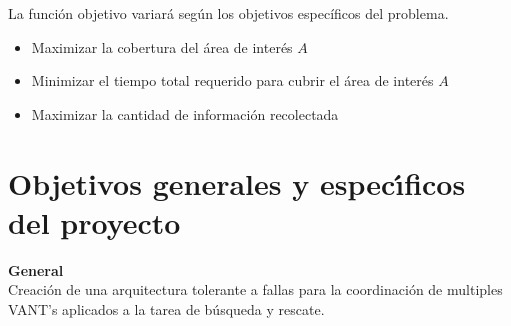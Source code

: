 \documentclass[11pt,epsf,times]{article}
\begin{document}
La función objetivo variará según los objetivos específicos del problema.
\begin{itemize}
\item Maximizar la cobertura del área de interés $A$
\item Minimizar el tiempo total requerido para cubrir el área de interés $A$
\item Maximizar la cantidad de información recolectada
\end{itemize}

\newpage
\section{Objetivos generales y espec\'{\i}ficos del proyecto}

\textbf{General} \\

Creación de una arquitectura tolerante a fallas para la coordinación de multiples VANT's aplicados a la tarea de búsqueda y rescate.
\end{document}
